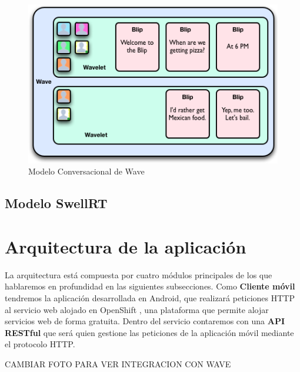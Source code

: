        \begin{figure}[H]
	  \centering
	    \includegraphics[keepaspectratio, scale=0.8]{Media/Captures/waveEntities.png}
	  \caption{Modelo Conversacional de Wave}
	  \label{fig:wave_model}
	\end{figure}
	
	\subsection{Modelo SwellRT}

\section{Arquitectura de la aplicación}

La arquitectura está compuesta por cuatro módulos principales de los que hablaremos en profundidad en las siguientes subsecciones. Como \textbf{Cliente móvil} tendremos la aplicación desarrollada en Android, que realizará peticiones HTTP al servicio web alojado en OpenShift \cite{ref:OpenShift}, una plataforma que permite alojar servicios web de forma gratuita. Dentro del servicio contaremos con una \textbf{API RESTful} que será quien gestione las peticiones de la aplicación móvil mediante el protocolo HTTP.

CAMBIAR FOTO PARA VER INTEGRACION CON WAVE

